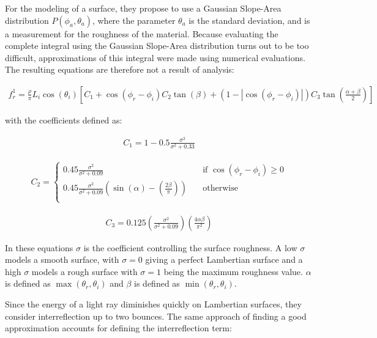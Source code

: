 For the modeling of a surface, they propose to use a Gaussian Slope-Area distribution $P(\phi_a, \theta_a)$, where the parameter $\theta_a$ is the standard deviation, and is a measurement for the roughness of the material. Because evaluating the complete integral using the Gaussian Slope-Area distribution turns out to be too difficult, approximations of this integral were made using numerical evaluations. The resulting equations are therefore not a result of analysis: 


	\begin{eqnarray*}
		f_r^1 = \frac{\rho}{\pi}L_i\cos(\theta_i)\left[C_1+\cos(\phi_r-\phi_i)C_2\tan(\beta) 
			  + (1-|\cos(\phi_r-\phi_i)|)C_3\tan\left(\frac{\alpha+\beta}{2}\right)\right]
	\end{eqnarray*}

\noindent with the coefficients defined as:

	\begin{eqnarray*}
		C_1 = 1 - 0.5\frac{\sigma^2}{\sigma^2+0.33}
	\end{eqnarray*}

	\begin{eqnarray*}
		C_2 =
			\begin{cases}
				0.45\frac{\sigma^2}{\sigma^2+0.09} 		& \quad \text{if $\cos(\phi_r - \phi_i) \geq 0$}\\
				0.45\frac{\sigma^2}{\sigma^2+0.09} \left( \sin(\alpha) - \left( \frac{2\beta}{\pi}\right)\right) 	& \quad \text{otherwise}\\
			\end{cases}
	\end{eqnarray*}

	\begin{eqnarray*}
		C_3 = 0.125 \left( \frac{\sigma^2}{\sigma^2+0.09} \right)\left( \frac{4\alpha\beta}{\pi^2} \right)
	\end{eqnarray*}

\noindent In these equations $\sigma$ is the coefficient controlling the surface roughness. A low $\sigma$ models a smooth surface, with $\sigma=0$ giving a perfect Lambertian surface and a high $\sigma$ models a rough surface with $\sigma=1$ being the maximum roughness value. $\alpha$ is defined as $\max(\theta_r, \theta_i)$ and $\beta$ is defined as $\min(\theta_r, \theta_i)$.

Since the energy of a light ray diminishes quickly on Lambertian surfaces, they consider interreflection up to two bounces. The same approach of finding a good approximation accounts for defining the interreflection term:

